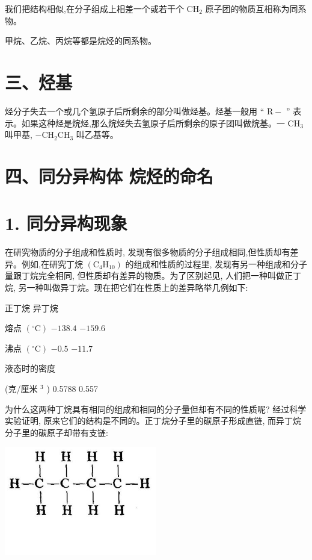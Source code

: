 \documentclass[10pt]{article}
\begin{document}
我们把结构相似,在分子组成上相差一个或若干个 \({\mathrm{{CH}}}_{2}\) 原子团的物质互相称为同系物。

甲烷、乙烷、丙烷等都是烷烃的同系物。

\section*{三、烃基}

烃分子失去一个或几个氢原子后所剩余的部分叫做烃基。烃基一般用 “ \(\mathrm{R} -\) ” 表示。如果这种烃是烷烃,那么烷烃失去氢原子后所剩余的原子团叫做烷基。一 \({\mathrm{{CH}}}_{3}\) 叫甲基, \(- {\mathrm{{CH}}}_{2}{\mathrm{{CH}}}_{3}\) 叫乙基等。

\section*{四、同分异构体 烷烃的命名}

\section*{1. 同分异构现象}

在研究物质的分子组成和性质时, 发现有很多物质的分子组成相同,但性质却有差异。例如,在研究丁烷 \(\left( {{\mathrm{C}}_{4}{\mathrm{H}}_{10}}\right)\) 的组成和性质的过程里, 发现有另一种组成和分子量跟丁烷完全相同, 但性质却有差异的物质。为了区别起见, 人们把一种叫做正丁烷, 另一种叫做异丁烷。现在把它们在性质上的差异略举几例如下:

正丁烷 异丁烷

熔点 \(\left( {{}^{ \circ }\mathrm{C}}\right)\) \(- {138.4}\) \(- {159.6}\)

沸点 \(\left( {{}^{ \circ }\mathrm{C}}\right)\) \(- {0.5}\) \(- {11.7}\)

液态时的密度

(克/厘米 \({}^{3}\) ) 0.5788 0.557

为什么这两种丁烷具有相同的组成和相同的分子量但却有不同的性质呢? 经过科学实验证明, 原来它们的结构是不同的。正丁烷分子里的碳原子形成直链, 而异丁烷分子里的碳原子却带有支链:

\begin{center}
\includegraphics[max width=0.5\textwidth]{images/01912d16-be99-77bb-9535-4f3ed8d9946f_62_189995.jpg}
\end{center}
\end{document}
